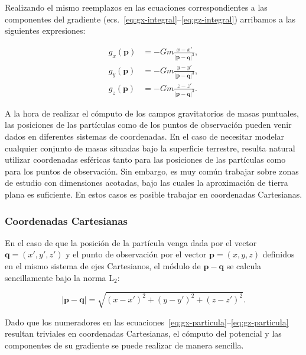 Realizando el mismo reemplazos en las ecuaciones correspondientes a las
componentes del gradiente (ecs.~\ref{eq:gx-integral}--\ref{eq:gz-integral})
arribamos a las siguientes expresiones:

\begin{align}
    g_x(\mathbf{p}) &=
        - G m
        \frac{x - x'}{|\mathbf{p} - \mathbf{q}|^3},
    \label{eq:gx-particula}
    \\
    g_y(\mathbf{p}) &=
        - G m
        \frac{y - y'}{|\mathbf{p} - \mathbf{q}|^3},
    \label{eq:gy-particula}
    \\
    g_z(\mathbf{p}) &=
        - G m
        \frac{z - z'}{|\mathbf{p} - \mathbf{q}|^3}.
    \label{eq:gz-particula}
\end{align}

A la hora de realizar el cómputo de los campos gravitatorios de masas
puntuales, las posiciones de las partículas como de los puntos de observación
pueden venir dados en diferentes sistemas de coordenadas.
En el caso de necesitar modelar cualquier conjunto de masas situadas bajo la
superficie terrestre, resulta natural utilizar coordenadas esféricas tanto para
las posiciones de las partículas como para los puntos de observación.
Sin embargo, es muy común trabajar sobre zonas de estudio con dimensiones
acotadas, bajo las cuales la aproximación de tierra plana es suficiente. En
estos casos es posible trabajar en coordenadas Cartesianas.

\subsubsection{Coordenadas Cartesianas}

En el caso de que la posición de la partícula venga dada por el vector
$\mathbf{q} = (x', y', z')$ y el punto de observación por el vector
$\mathbf{p} = (x, y, z)$ definidos en el mismo sistema de ejes Cartesianos, el
módulo de
$\mathbf{p} - \mathbf{q}$ se calcula sencillamente bajo la norma L$_2$:

\begin{equation}
    | \mathbf{p} - \mathbf{q} | = \sqrt{
        (x - x')^2 + (y - y')^2 + (z - z')^2
    }.
\end{equation}

Dado que los numeradores en las
ecuaciones~\ref{eq:gx-particula}--\ref{eq:gz-particula} resultan triviales en
coordenadas Cartesianas, el cómputo del potencial y las componentes de su
gradiente se puede realizar de manera sencilla.

